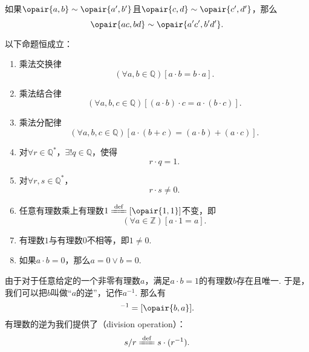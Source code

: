\begin{lemma}\label{theorem:集合论.有理数集上的乘法运算是良定的}
如果\(\opair{a,b}\sim\opair{a',b'}\)且\(\opair{c,d}\sim\opair{c',d'}\)，那么\[
	\opair{ac,bd}\sim\opair{a'c',b'd'}.
\]
\end{lemma}

\begin{theorem}\label{theorem:集合论.有理数乘法的运算法则}
以下命题恒成立：
\begin{enumerate}
	\item 乘法交换律
	\begin{equation}\label{equation:集合论.有理数乘法交换律}
		(\forall a,b\in\mathbb{Q})[a \cdot b = b \cdot a].
	\end{equation}
	\item 乘法结合律
	\begin{equation}\label{equation:集合论.有理数乘法结合律}
		(\forall a,b,c\in\mathbb{Q})[(a \cdot b) \cdot c = a \cdot (b \cdot c)].
	\end{equation}
	\item 乘法分配律
	\begin{equation}\label{equation:集合论.有理数乘法分配律}
		(\forall a,b,c\in\mathbb{Q})[a \cdot (b + c) = (a \cdot b) + (a \cdot c)].
	\end{equation}
	\item 对\(\forall r\in\mathbb{Q}^*\)，\(\exists! q\in\mathbb{Q}\)，使得\[
		r \cdot q = 1.
	\]
	\item 对\(\forall r,s\in\mathbb{Q}^*\)，\[
		r \cdot s \neq 0.
	\]
	\item 任意有理数乘上有理数\(1\defeq[\opair{1,1}]\)不变，即
	\begin{equation}\label{equation:集合论.任意有理数乘上一不变}
		(\forall a\in\mathbb{Z})[a \cdot 1 = a].
	\end{equation}
	\item 有理数\(1\)与有理数\(0\)不相等，即\(1\neq0\).
	\item 如果\(a \cdot b = 0\)，那么\(a = 0 \lor b = 0\).
\end{enumerate}
\end{theorem}

由于对于任意给定的一个非零有理数\(a\)，满足\(a \cdot b = 1\)的有理数\(b\)存在且唯一.
于是，我们可以把\(b\)叫做“\(a\)的逆”，记作\(a^{-1}\).
那么有\begin{equation}
	[\opair{a,b}]^{-1}=[\opair{b,a}].
\end{equation}
有理数的逆为我们提供了（division operation）：
\begin{equation}
	s/r \defeq s \cdot (r^{-1}).
\end{equation}

